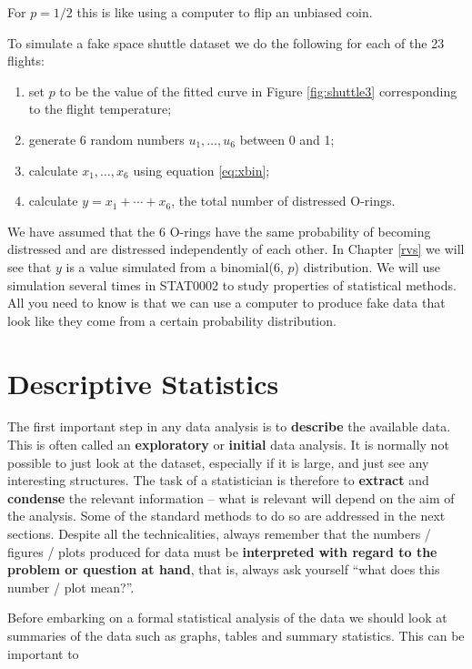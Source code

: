 \documentclass[
  11pt,
  british,
  openany, a4paper]{book}
\providecommand{\tightlist}{%
  \setlength{\itemsep}{0pt}\setlength{\parskip}{0pt}}
\begin{document}
For \(p=1/2\) this is like using a computer to flip an unbiased coin.

To simulate a fake space shuttle dataset we do the following for each of the 23 flights:

\begin{enumerate}
\def\labelenumi{\arabic{enumi}.}
\tightlist
\item
  set \(p\) to be the value of the fitted curve in Figure \ref{fig:shuttle3} corresponding to the flight temperature;
\item
  generate 6 random numbers \(u_1, \ldots, u_6\) between 0 and 1;
\item
  calculate \(x_1, \ldots, x_6\) using equation \eqref{eq:xbin};
\item
  calculate \(y=x_1+\cdots+x_6\), the total number of distressed O-rings.
\end{enumerate}

We have assumed that the 6 O-rings have the same probability of becoming distressed and are distressed independently of each other. In Chapter \ref{rvs} we will see that \(y\) is a value simulated from a binomial(6, \(p\)) distribution. We will use simulation several times in STAT0002 to study properties of statistical methods. All you need to know is that we can use a computer to produce fake data that look like they come from a certain probability distribution.

\hypertarget{descriptive-statistics}{%
\chapter{Descriptive Statistics}\label{descriptive-statistics}}

The first important step in any data analysis is to \textbf{describe} the
available data. This is often called an \textbf{exploratory} or \textbf{initial} data analysis. It is normally not possible to just look at the dataset, especially if it is large, and just see any interesting structures. The task of a statistician is therefore to \textbf{extract} and \textbf{condense} the relevant information -- what is relevant will depend on the aim of the analysis. Some of the standard methods to do so are addressed in the next sections. Despite all the technicalities, always remember that the numbers / figures / plots produced for data must be \textbf{interpreted with regard to the problem or question at hand}, that is, always ask yourself ``what does this number / plot mean?''.

Before embarking on a formal statistical analysis of the data we should look at summaries of the data such as graphs, tables and summary statistics. This can be important to
\end{document}
